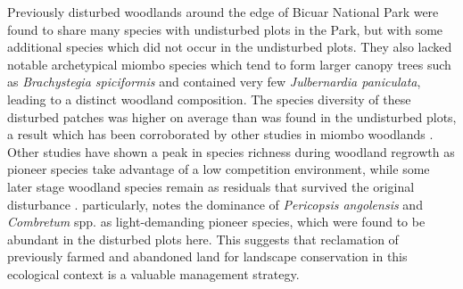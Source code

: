 \begin{refsection}
Previously disturbed woodlands around the edge of Bicuar National Park were found to share many species with undisturbed plots in the Park, but with some additional species which did not occur in the undisturbed plots. They also lacked notable archetypical miombo species which tend to form larger canopy trees such as \textit{Brachystegia spiciformis} and contained very few \textit{Julbernardia paniculata}, leading to a distinct woodland composition. The species diversity of these disturbed patches was higher on average than was found in the undisturbed plots, a result which has been corroborated by other studies in miombo woodlands \citep{Caro2001, McNicol2018b, Shackleton2000}. Other studies have shown a peak in species richness during woodland regrowth as pioneer species take advantage of a low competition environment, while some later stage woodland species remain as residuals that survived the original disturbance \citep{Goncalves2017, Kalaba2013}. \citet{Goncalves2017} particularly, notes the dominance of \textit{Pericopsis angolensis} and \textit{Combretum} spp. as light-demanding pioneer species, which were found to be abundant in the disturbed plots here. This suggests that reclamation of previously farmed and abandoned land for landscape conservation in this ecological context is a valuable management strategy.


\end{refsection}
